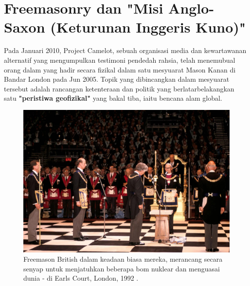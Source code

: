\documentclass[10pt,twocolumn,letterpaper]{article}
\begin{document}
\section{Freemasonry dan "Misi Anglo-Saxon (Keturunan Inggeris Kuno)" }
Pada Januari 2010, Project Camelot, sebuah organisasi media dan kewartawanan alternatif yang mengumpulkan testimoni pendedah rahsia, telah menemubual \cite{4,6} orang dalam yang hadir secara fizikal dalam satu mesyuarat Mason Kanan di Bandar London pada Jun 2005. Topik yang dibincangkan dalam mesyuarat tersebut adalah rancangan ketenteraan dan politik yang berlatarbelakangkan satu \textbf{"peristiwa geofizikal"} yang bakal tiba, iaitu bencana alam global.

\begin{figure}[b]
\begin{center}
   \includegraphics[width=1\linewidth]{freemason.jpg}
\end{center}
   \caption{Freemason British dalam keadaan biasa mereka, merancang secara senyap untuk menjatuhkan beberapa bom nuklear dan menguasai dunia - di Earls Court, London, 1992 \cite{5}.}
\label{fig:1}
\label{fig:onecol}
\end{figure}
\end{document}
